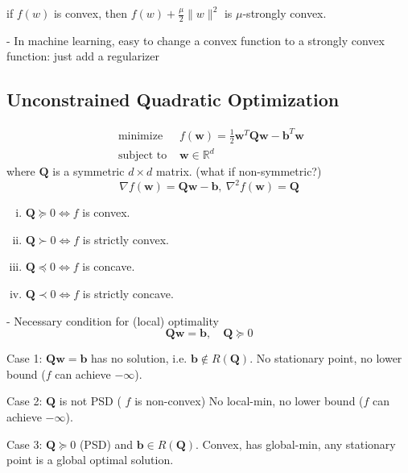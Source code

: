 \documentclass[11pt,a4paper]{article}
\begin{document}
if $f(w)$ is convex, then $f(w)+\frac{\mu}{2}\|w\|^{2}$ is $\mu$-strongly convex.

- In machine learning, easy to change a convex function to a strongly convex function: just add a regularizer

\subsection{Unconstrained Quadratic Optimization}
$$\begin{array}{ll}\text { minimize } & f(\mathbf{w})=\frac{1}{2} \mathbf{w}^{T} \mathbf{Q} \mathbf{w}-\mathbf{b}^{T} \mathbf{w} \\ \text { subject to } & \mathbf{w} \in \mathbb{R}^{d}\end{array}$$
where $\mathbf{Q}$ is a symmetric $d \times d$ matrix. (what if non-symmetric?)
$$\nabla f(\mathbf{w})=\mathbf{Q}\mathbf{w}-\mathbf{b},\ \nabla^2 f(\mathbf{w})=\mathbf{Q}$$
\begin{enumerate}[(i)]
    \item $\mathbf{Q}\succeq 0 \Leftrightarrow	f$ is convex.
    \item $\mathbf{Q}\succ 0 \Leftrightarrow	f$ is strictly convex.
    \item $\mathbf{Q}\preceq 0 \Leftrightarrow	f$ is concave.
    \item $\mathbf{Q}\prec 0 \Leftrightarrow	f$ is strictly concave.
\end{enumerate}









- Necessary condition for (local) optimality
$$
\mathbf{Q} \mathbf{w}=\mathbf{b}, \quad \mathbf{Q} \succeq 0
$$

Case 1: $\mathbf{Q w}=\mathbf{b}$ has no solution, i.e. $\mathbf{b} \notin R(\mathbf{Q})$. No stationary point, no lower bound ($f$ can achieve $-\infty$).

Case 2: $\mathbf{Q}$ is not PSD ( $f$ is non-convex)
No local-min, no lower bound ($f$ can achieve $-\infty$).

Case 3: $\mathbf{Q} \succeq 0$ (PSD) and $\mathbf{b} \in R(\mathbf{Q})$. Convex, has global-min, 
any stationary point is a global optimal solution.
\end{document}
